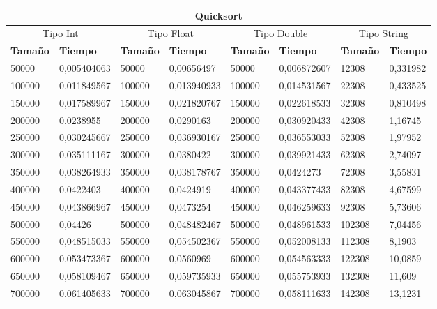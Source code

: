 \documentclass[11pt,openany]{book}
\begin{document}
\begin{table}[!ht]
    \centering
    \small
    \begin{tabular}{|l|l|l|l|l|l|l|l|}
    \hline
    \multicolumn{8}{|c|}{\cellcolor{blue!20}\textbf{Quicksort}} \\ \hline
    \multicolumn{2}{|c|}{\cellcolor{gray!20}Tipo Int} & \multicolumn{2}{c|}{\cellcolor{gray!20}Tipo Float} & \multicolumn{2}{c|}{\cellcolor{gray!20}Tipo Double} & \multicolumn{2}{c|}{\cellcolor{gray!20}Tipo String}\\ \hline
        \textbf{Tamaño} & \textbf{Tiempo} & \textbf{Tamaño} & \textbf{Tiempo} & \textbf{Tamaño} & \textbf{Tiempo} & \textbf{Tamaño} & \textbf{Tiempo} \\ \hline
        50000 & 0,005404063 & 50000 & 0,00656497 & 50000 & 0,006872607 & 12308 & 0,331982 \\ \hline
        100000 & 0,011849567 & 100000 & 0,013940933 & 100000 & 0,014531567 & 22308 & 0,433525 \\ \hline
        150000 & 0,017589967 & 150000 & 0,021820767 & 150000 & 0,022618533 & 32308 & 0,810498 \\ \hline
        200000 & 0,0238955 & 200000 & 0,0290163 & 200000 & 0,030920433 & 42308 & 1,16745 \\ \hline
        250000 & 0,030245667 & 250000 & 0,036930167 & 250000 & 0,036553033 & 52308 & 1,97952 \\ \hline
        300000 & 0,035111167 & 300000 & 0,0380422 & 300000 & 0,039921433 & 62308 & 2,74097 \\ \hline
        350000 & 0,038264933 & 350000 & 0,038178767 & 350000 & 0,0424273 & 72308 & 3,55831 \\ \hline
        400000 & 0,0422403 & 400000 & 0,0424919 & 400000 & 0,043377433 & 82308 & 4,67599 \\ \hline
        450000 & 0,043866967 & 450000 & 0,0473254 & 450000 & 0,046259633 & 92308 & 5,73606 \\ \hline
        500000 & 0,04426 & 500000 & 0,048482467 & 500000 & 0,048961533 & 102308 & 7,04456 \\ \hline
        550000 & 0,048515033 & 550000 & 0,054502367 & 550000 & 0,052008133 & 112308 & 8,1903 \\ \hline
        600000 & 0,053473367 & 600000 & 0,0560969 & 600000 & 0,054563333 & 122308 & 10,0859 \\ \hline
        650000 & 0,058109467 & 650000 & 0,059735933 & 650000 & 0,055753933 & 132308 & 11,609 \\ \hline
        700000 & 0,061405633 & 700000 & 0,063045867 & 700000 & 0,058111633 & 142308 & 13,1231 \\ \hline

\end{tabular}
\end{table}
\end{document}
